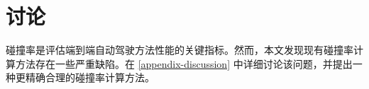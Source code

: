 \section{讨论}
碰撞率是评估端到端自动驾驶方法性能的关键指标。然而，本文发现现有碰撞率计算方法存在一些严重缺陷。在 \cref{appendix-discussion} 中详细讨论该问题，并提出一种更精确合理的碰撞率计算方法。
